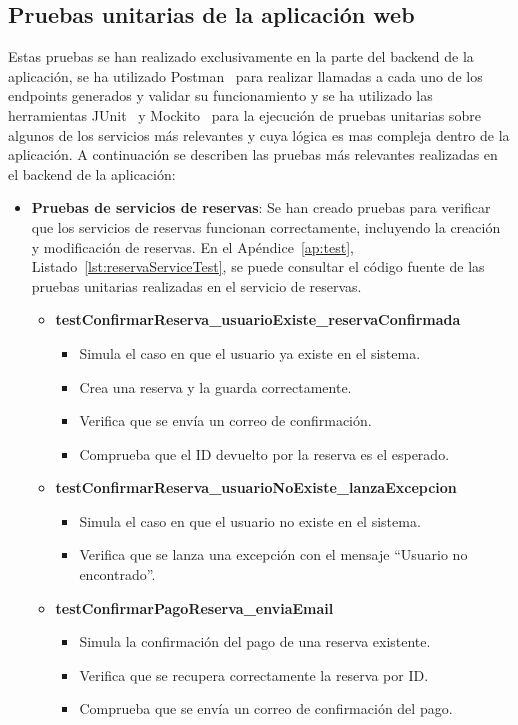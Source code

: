 \subsection{Pruebas unitarias de la aplicación web}
Estas pruebas se han realizado exclusivamente en la parte del \gls{backend} de la aplicación, se ha utilizado Postman~\cite{postman:web} para realizar llamadas a cada uno de los endpoints generados y validar su funcionamiento y se ha utilizado las herramientas JUnit~\cite{junit:web} y Mockito~\cite{mockito:web} para la ejecución de pruebas unitarias sobre algunos de los servicios más relevantes y cuya lógica es mas compleja dentro de la aplicación. A continuación se describen las pruebas más relevantes realizadas en el \gls{backend} de la aplicación:
\begin{itemize}
    \item \textbf{Pruebas de servicios de reservas}: Se han creado pruebas para verificar que los servicios de reservas funcionan correctamente, incluyendo la creación y modificación de reservas. En el Apéndice~\ref{ap:test}, Listado~\ref{lst:reservaServiceTest}, se puede consultar el código fuente de las pruebas unitarias realizadas en el servicio de reservas.
     \begin{itemize}
      \item \textbf{testConfirmarReserva\_usuarioExiste\_reservaConfirmada}
        \begin{itemize}
          \item Simula el caso en que el usuario ya existe en el sistema.
          \item Crea una reserva y la guarda correctamente.
          \item Verifica que se envía un correo de confirmación.
          \item Comprueba que el ID devuelto por la reserva es el esperado.
        \end{itemize}

      \item \textbf{testConfirmarReserva\_usuarioNoExiste\_lanzaExcepcion}
        \begin{itemize}
          \item Simula el caso en que el usuario no existe en el sistema.
          \item Verifica que se lanza una excepción con el mensaje ``Usuario no encontrado''.
        \end{itemize}

      \item \textbf{testConfirmarPagoReserva\_enviaEmail}
        \begin{itemize}
          \item Simula la confirmación del pago de una reserva existente.
          \item Verifica que se recupera correctamente la reserva por ID.
          \item Comprueba que se envía un correo de confirmación del pago.
        \end{itemize}


\end{itemize}
\end{itemize}
